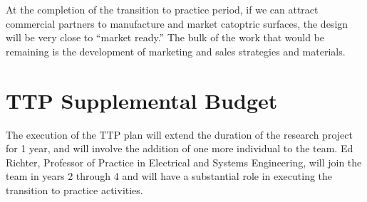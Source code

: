 \documentclass[11pt]{article}
\begin{document}
At the completion of the transition to practice period, if we can
attract commercial partners to manufacture and market catoptric surfaces,
the design will be very close to ``market ready.''  The bulk of the
work that would be remaining is the development of marketing and sales
strategies and materials.

\section{TTP Supplemental Budget}

The execution of the TTP plan will extend the duration of the research
project for 1 year, and will involve the addition of one more individual
to the team.  Ed Richter, Professor of Practice in Electrical and Systems
Engineering, will join the team in years 2 through 4 and will have a
substantial role in executing the transition to practice activities.
\end{document}
